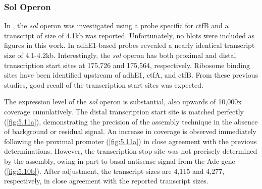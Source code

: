 \subsubsection{Sol Operon}
In \cite{65}, the \textit{sol} operon was investigated using a probe specific for ctfB and a transcript of size of 4.1kb was reported. Unfortunately, no blots were included as figures in this work. In \cite{63} adhE1-based probes revealed a nearly identical transcript size of 4.1-4.2kb. Interestingly, the \textit{sol} operon has both proximal and distal transcription start sites at 175,726 and 175,564, respectively\cite{62,63}. Ribosome binding sites have been identified upstream of adhE1, ctfA, and ctfB\cite{63}. From these previous studies, good recall of the transcription start sites was expected.

The expression level of the \textit{sol} operon is substantial, also upwards of 10,000x coverage cumulatively. The distal transcription start site is matched perfectly (\ref{fig:5.11a}), demonstrating the precision of the assembly technique in the absence of background or residual signal. An increase in coverage is observed immediately following the proximal promoter (\ref{fig:5.11a}) in close agreement with the previous determinations\cite{62,63}. However, the transcription stop site was not precisely determined by the assembly, owing in part to basal antisense signal from the Adc gene (\ref{fig:5.10b}). After adjustment, the transcript sizes are 4,115 and 4,277, respectively, in close agreement with the reported transcript sizes\cite{63,65}.

